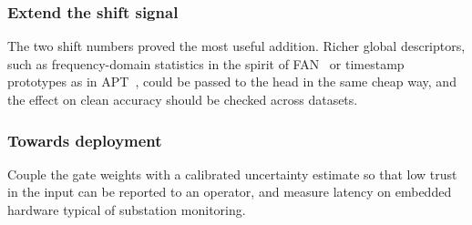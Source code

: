 \subsubsection{Extend the shift signal}
The two shift numbers proved the most useful addition. Richer global descriptors, such as frequency-domain statistics in the spirit of FAN~\cite{fan} or timestamp prototypes as in APT~\cite{apt}, could be passed to the head in the same cheap way, and the effect on clean accuracy should be checked across datasets.

\subsubsection{Towards deployment}
Couple the gate weights with a calibrated uncertainty estimate so that low trust in the input can be reported to an operator, and measure latency on embedded hardware typical of substation monitoring.
